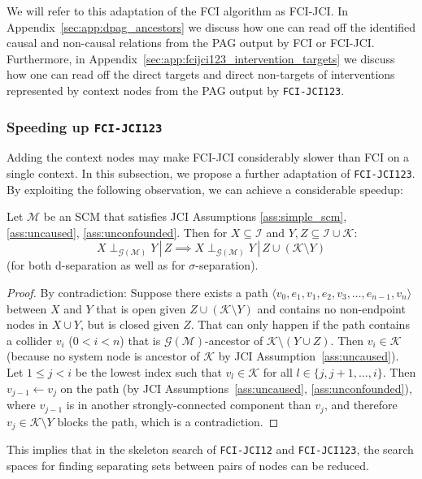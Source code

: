 \documentclass[twoside,11pt]{article}
\DeclareMathOperator*{\SEP}{\perp}
\newcommand\sep[4]{{#1} \SEP_{#4} {#2} \given {#3}}
\newcommand\C[1]{\mathcal{#1}}
\newcommand\given{\,|\,}
\newcommand{\ot}{\leftarrow}
\newcommand{\alg}[1]{\texttt{#1}}
\newcommand{\JCIAB}{\ref{ass:uncaused}, \ref{ass:unconfounded}}
\begin{document}
We will refer to this adaptation of the FCI algorithm as FCI-JCI.
In Appendix~\ref{sec:app:dpag_ancestors} we discuss how one can read off the identified causal and non-causal relations 
from the PAG output by FCI or FCI-JCI. 
Furthermore, in Appendix~\ref{sec:app:fcijci123_intervention_targets} we discuss how one can read off the direct targets and
direct non-targets of interventions represented by context nodes from the PAG output by \alg{FCI-JCI123}.

\subsubsection{Speeding up \alg{FCI-JCI123}\label{sec:fci-jci123r}}

Adding the context nodes may make FCI-JCI considerably slower than FCI on a single context. In this subsection,
we propose a further adaptation of \alg{FCI-JCI123}. By exploiting the following observation, we can achieve a considerable speedup:
\begin{lemma}\label{lemm:restricted_separations_jci12}
  Let $\C{M}$ be an SCM that satisfies JCI Assumptions \ref{ass:simple_scm}, \ref{ass:uncaused}, \ref{ass:unconfounded}. 
  Then for $X \subseteq \C{I}$ and $Y, Z \subseteq \C{I} \cup \C{K}$:
  $$\sep{X}{Y}{Z}{\C{G}(\C{M})} \implies \sep{X}{Y}{Z \cup (\C{K} \setminus Y)}{\C{G}(\C{M})}$$
  (for both d-separation as well as for $\sigma$-separation).
\end{lemma}
\begin{proof}
  By contradiction: Suppose there exists a path $\langle v_0,e_1,v_1,e_2,v_3,\dots,e_{n-1},v_n \rangle$ between $X$ and $Y$ that is open given $Z \cup (\C{K} \setminus Y)$ and contains no non-endpoint nodes in $X \cup Y$, but is closed given $Z$.
  That can only happen if the path contains a collider $v_i$ ($0 < i < n$) that is $\C{G}(\C{M})$-ancestor of $\C{K} \setminus (Y \cup Z)$.
  Then $v_i \in \C{K}$ (because no system node is ancestor of $\C{K}$ by JCI Assumption~\ref{ass:uncaused}).
  Let $1 \le j < i$ be the lowest index such that $v_l \in \C{K}$ for all $l \in \{j, j+1, \dots, i\}$.
  Then $v_{j-1} \ot v_j$ on the path (by JCI Assumptions~\JCIAB), where $v_{j-1}$ is in another strongly-connected component than $v_j$, and therefore $v_j \in \C{K} \setminus Y$ blocks the path, which is a contradiction.
\end{proof}
This implies that in the skeleton search of \alg{FCI-JCI12} and \alg{FCI-JCI123}, the search spaces for finding separating sets between pairs of nodes can be reduced.
\end{document}
